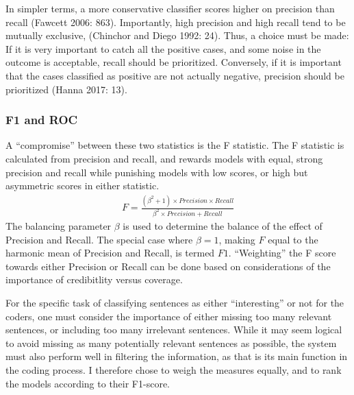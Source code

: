 \documentclass[12pt,twoside]{reedthesis}
\begin{document}
In simpler terms, a more conservative classifier scores higher on
precision than recall (Fawcett 2006: 863). Importantly, high precision
and high recall tend to be mutually exclusive, (Chinchor and Diego 1992:
24). Thus, a choice must be made: If it is very important to catch all
the positive cases, and some noise in the outcome is acceptable, recall
should be prioritized. Conversely, if it is important that the cases
classified as positive are not actually negative, precision should be
prioritized (Hanna 2017: 13).

\subsubsection{F1 and ROC}\label{f1-and-roc}

A ``compromise'' between these two statistics is the F statistic. The F
statistic is calculated from precision and recall, and rewards models
with equal, strong precision and recall while punishing models with low
scores, or high but asymmetric scores in either statistic.
\begin{align*}
 F = \frac{(\beta^{2} + 1) \times Precision \times Recall}
          {\beta^{2}\times Precision + Recall}
\end{align*}
The balancing parameter \(\beta\) is used to determine the balance of
the effect of Precision and Recall. The special case where
\(\beta = 1\), making \(F\) equal to the harmonic mean of Precision and
Recall, is termed \(F1\). ``Weighting'' the F score towards either
Precision or Recall can be done based on considerations of the
importance of credibitlity versus coverage.

For the specific task of classifying sentences as either ``interesting''
or not for the coders, one must consider the importance of either
missing too many relevant sentences, or including too many irrelevant
sentences. While it may seem logical to avoid missing as many
potentially relevant sentences as possible, the system must also perform
well in filtering the information, as that is its main function in the
coding process. I therefore chose to weigh the measures equally, and to
rank the models according to their F1-score.
\end{document}
